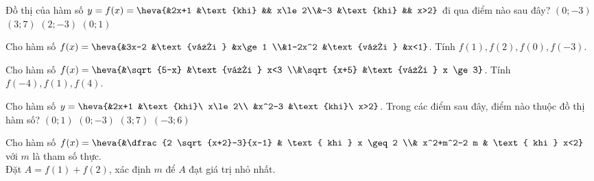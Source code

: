 \begin{ex}%
	Đồ  thị của hàm số $y=f(x)=\heva{&2x+1 &\text{khi} && x\le 2\\&-3 &\text{khi} && x>2}$ đi qua điểm nào sau đây?
	 \choice
		 {$(0;-3)$}
		 {$(3;7)$}
		 {$(2;-3)$}
		{\True  $(0;1)$}
\end{ex}

\begin{bt}%
	Cho hàm số $f(x)=\heva{&3x-2 &\text{với } &x\ge 1 \\&1-2x^2 &\text{với } &x<1}$. Tính $f(1), f(2), f(0), f(-3)$.
\end{bt}

\begin{bt}%
	Cho hàm số $f(x)=\heva{&\sqrt{5-x} &\text{với } x<3 \\&\sqrt{x+5} &\text{với } x \ge 3}$. Tính $f(-4), f(1), f(4)$.
\end{bt}

\begin{ex}%
	Cho hàm số $y=\heva{&2x+1 &\text{khi}\ x\le 2\\ &x^2-3 &\text{khi}\ x>2}$. Trong các điểm sau đây, điểm  nào thuộc đồ thị hàm số?
	 \choice
		{\True  $(0;1)$}
		{$(0;-3)$} 
		{$(3;7)$} 
		 {$(-3;6)$}
\end{ex}

\begin{bt}%
	Cho hàm số $f(x)= \heva{&\dfrac{2 \sqrt{x+2}-3}{x-1} & \text { khi } x \geq 2 \\& x^2+m^2-2 m & \text { khi } x<2}$ với $m$ là tham số thực.\\
	Đặt $A=f(1)+f(2)$, xác định $m$ để $A$ đạt giá trị nhỏ nhất.
\end{bt}

